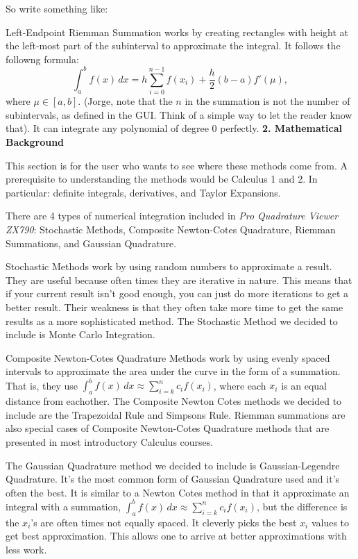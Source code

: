 \documentclass[12pt]{article}
\newcommand{\newLine}{\vspace{5mm}}
\newcommand{\appname}{\textit{Pro Quadrature Viewer ZX790}}
\newcommand{\nextsection}[1]{\newpage\noindent\Large\textbf{#1}\vspace{10mm}\normalsize}
\newcommand{\integral}[3]{\text{$\int^{#2}_{#1} #3\,dx$}}
\newcommand{\summation}[3]{\text{$\sum^{#2}_{#1} #3$}}
\begin{document}
So write something like:

\newLine Left-Endpoint Riemman Summation works by creating rectangles with height at the left-most part of the subinterval to approximate the integral. It follows the followng formula:
\begin{equation*} \integral{a}{b}{f(x)} = h\summation{i = 0}{n - 1}{f(x_i)} + \frac{h}{2}(b-a)f'(\mu), \end{equation*}
where $\mu\in[a,b]$. (Jorge, note that the $n$ in the summation is not the number of subintervals, as defined in the GUI. Think of a simple way to let the reader know that). It can integrate any polynomial of degree 0 perfectly. 
\nextsection{2. Mathematical Background}

This section is for the user who wants to see where these methods come from. A prerequisite to understanding the methods would be Calculus 1 and 2. In particular: definite integrals, derivatives, and Taylor Expansions. 

There are 4 types of numerical integration included in \appname: Stochastic Methods, Composite Newton-Cotes Quadrature, Riemman Summations, and Gaussian Quadrature. 

Stochastic Methods work by using random numbers to approximate a result. They are useful because often times they are iterative in nature. This means that if your current result isn't good enough, you can just do more iterations to get a better result. Their weakness is that they often take more time to get the same results as a more sophisticated method. The Stochastic Method we decided to include is Monte Carlo Integration. 

Composite Newton-Cotes Quadrature Methods work by using evenly spaced intervals to approximate the area under the curve in the form of a summation. That is, they use $\integral{a}{b}{f(x)} \approx \summation{i=k}{n}{c_if(x_i)}$, where each $x_i$ is an equal distance from eachother. The Composite Newton Cotes methods we decided to include are the Trapezoidal Rule and Simpsons Rule. Riemman summations are also special cases of Composite Newton-Cotes Quadrature methods that are presented in most introductory Calculus courses. 

The Gaussian Quadrature method we decided to include is Gaussian-Legendre Quadrature. It's the most common form of Gaussian Quadrature used and it's often the best. It is similar to a Newton Cotes method in that it approximate an integral with a summation, $\integral{a}{b}{f(x)} \approx \summation{i=k}{n}{c_if(x_i)}$, but the difference is the $x_i$'s are often times not equally spaced. It cleverly picks the best $x_i$ values to get best approximation. This allows one to arrive at better approximations with less work.
\end{document}
